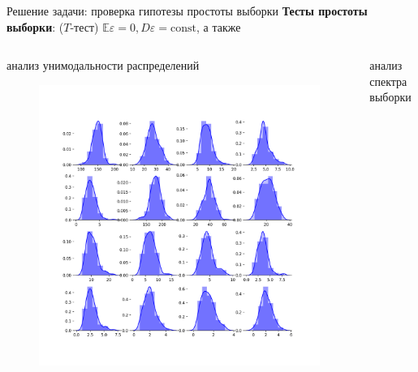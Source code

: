 \documentclass{beamer}
\newcommand{\eps}{\varepsilon}
\begin{document}
\begin{frame}{Решение задачи: проверка гипотезы простоты выборки}
    \textbf{Тесты простоты выборки}: ($T$-тест) $\mathbb{E} \eps = 0, D \eps = \mathrm{const}$, а также

    \begin{columns}[T] %
        \begin{column}{.48\textwidth}
        анализ унимодальности распределений

    \begin{figure}[ht]
        \centering
          \includegraphics[width=\textwidth]{../pics/features_unimodality_short.png}
    \end{figure}

        \end{column}%
        \hfill%
        \begin{column}{.48\textwidth}
        анализ спектра выборки


\end{column}
\end{columns}
\end{frame}
\end{document}
